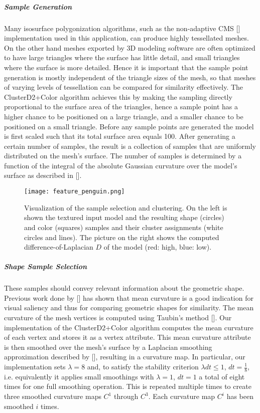 \subparagraph{Sample Generation}

Many isosurface polygonization algorithms, such as the non-adaptive CMS []
implementation used in this application, can produce highly tessellated meshes. On the other hand meshes exported by
3D modeling software are often optimized to have large triangles where the surface has little detail, and small triangles where
the surface is more detailed. Hence it is important that the sample point generation is mostly independent of the triangle sizes
of the mesh, so that meshes of varying levels of tessellation can be compared for similarity effectively.
The ClusterD2+Color algorithm achieves this by making the sampling directly proportional to the surface area of the triangles, hence a sample point
has a higher chance to be positioned on a large triangle, and a smaller chance to be positioned on a small triangle.
Before any sample points are generated the model is first scaled such that its total surface area equals 100.
After generating a certain number of samples, the result is a collection of samples that are uniformly distributed on the mesh's surface. The number of samples
is determined by a function of the integral of the absolute Gaussian curvature over the model's surface as described in [].

\begin{figure}
\centering
\captionsetup{width=0.8\textwidth}
\texttt{[image: feature\_penguin.png]}
\caption{Visualization of the sample selection and clustering. On the left is shown the textured input model and the resulting shape (circles) and color (squares) samples
and their cluster assignments (white circles and lines). The picture on the right shows the computed difference-of-Laplacian $D$ of the model (red: high, blue: low).}
\label{fig:feature_penguin}
\end{figure}

\subparagraph{Shape Sample Selection}

These samples should convey relevant information about the geometric shape. Previous work done by [] has
shown that mean curvature is a good indication for visual saliency and thus for comparing geometric shapes for similarity. The mean curvature of the mesh vertices is computed using Taubin's method [].
Our implementation of the ClusterD2+Color algorithm computes the mean curvature of each vertex and stores it as a vertex attribute. This mean curvature attribute is then smoothed over the mesh's surface
by a Laplacian smoothing approximation described by [], resulting in a curvature map.
In particular, our implementation sets $\lambda = 8$ and, to satisfy the stability criterion $\lambda dt \leq 1$, $dt = \frac{1}{8}$, i.e. equivalently it applies small smoothings with $\lambda = 1$, $dt = 1$ a total of eight times for one
full smoothing operation. This is repeated multiple times to create three smoothed curvature maps $C^1$ through $C^3$. Each curvature map $C^i$ has been smoothed $i$ times.

